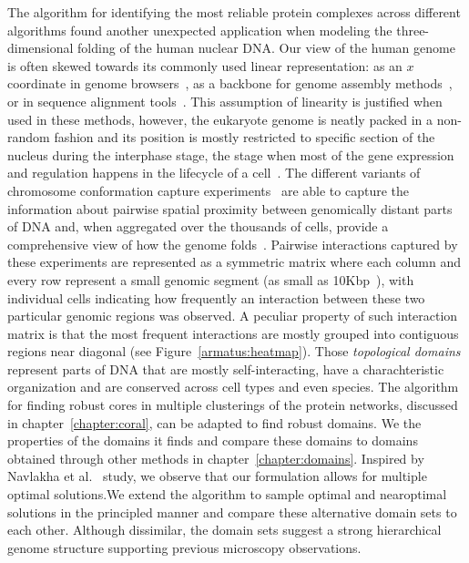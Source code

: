 The algorithm for identifying the most reliable protein complexes across different algorithms found another unexpected application when modeling the three-dimensional folding of the human nuclear DNA. Our view of the human genome is often skewed towards its commonly used linear representation: as an $x$ coordinate in genome browsers~\cite{UCSDGenomeBrowser}, as a backbone for genome assembly methods~\cite{Iqbal2012,Pell2012}, or in sequence alignment tools~\cite{DobinSTAR,BWA}. This assumption of linearity is justified when used in these methods, however, the eukaryote genome is neatly packed in a non-random fashion and its position is mostly restricted to specific section of the nucleus during the interphase stage, the stage when most of the gene expression and regulation happens in the lifecycle of a cell~\cite{Cavalli2013}. The different variants of chromosome conformation capture experiments~\cite{Dekker2002,4C,highC,5C} are able to capture the information about pairwise spatial proximity between genomically distant parts of DNA and, when aggregated over the thousands of cells, provide a comprehensive view of how the genome folds~\cite{LiebermanAiden2009}. Pairwise interactions captured by these experiments are represented as a symmetric matrix where each column and every row represent a small genomic segment (as small as 10Kbp~\cite{Jin2013}), with individual cells indicating how frequently an interaction between these two particular genomic regions was observed. A peculiar property of such interaction matrix is that the most frequent interactions are mostly grouped into contiguous regions near diagonal (see Figure~\ref{armatus:heatmap}). Those \textit{topological domains} represent parts of DNA that are mostly self-interacting, have a charachteristic organization and are conserved across cell types and even species. The algorithm for finding robust cores in multiple clusterings of the protein networks, discussed in chapter~\ref{chapter:coral}, can be adapted to find robust domains. We the properties of the domains it finds and compare these domains to domains obtained through other methods in chapter~\ref{chapter:domains}. Inspired by Navlakha et al.~\cite{Navlakha10} study, we observe that our formulation allows for multiple optimal solutions.We extend the algorithm to sample optimal and nearoptimal solutions in the principled manner and compare these alternative domain sets to each other. Although dissimilar, the domain sets suggest a strong hierarchical genome structure supporting previous microscopy observations.


